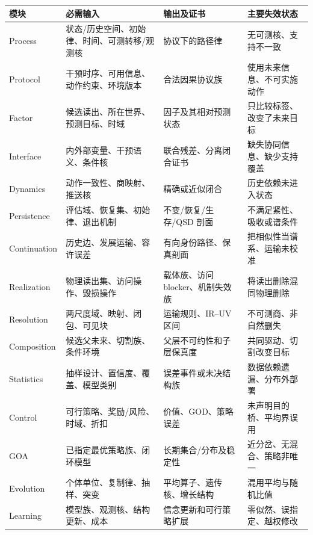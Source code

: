 \documentclass[
  11pt,
  oneside]{book}
\newcounter{none} %
\begin{document}
{\def\LTcaptype{none} %
\begin{longtable}[]{@{}
  >{\raggedright\arraybackslash}p{}
  >{\raggedright\arraybackslash}p{}
  >{\raggedright\arraybackslash}p{}
  >{\raggedright\arraybackslash}p{}@{}}
\toprule\noalign{}
\begin{minipage}[b]{\linewidth}\raggedright
模块
\end{minipage} & \begin{minipage}[b]{\linewidth}\raggedright
必需输入
\end{minipage} & \begin{minipage}[b]{\linewidth}\raggedright
输出及证书
\end{minipage} & \begin{minipage}[b]{\linewidth}\raggedright
主要失效状态
\end{minipage} \\
\midrule\noalign{}
\endhead
\bottomrule\noalign{}
\endlastfoot
Process & 状态/历史空间、初始律、时间、可测转移/观测核 & 协议下的路径律 & 无可测核、支持不一致 \\
Protocol & 干预时序、可用信息、动作约束、环境版本 & 合法因果协议族 & 使用未来信息、不可实施动作 \\
Factor & 候选读出、所在世界、预测目标、时域 & 因子及其相对预测状态 & 只比较标签、改变了未来目标 \\
Interface & 内外部变量、干预语义、条件核 & 联合残差、分离闭合证书 & 缺失协同信息、缺少支持覆盖 \\
Dynamics & 动作一致性、商映射、推送核 & 精确或近似闭合 & 历史依赖未进入状态 \\
Persistence & 评估域、恢复集、初始律、退出机制 & 不变/恢复/生存/QSD 剖面 & 不满足紧性、吸收或谱条件 \\
Continuation & 历史边、发展运输、容许误差 & 有向身份路径、保真剖面 & 把相似性当谱系、运输未校准 \\
Realization & 物理读出集、访问操作、毁损操作 & 载体族、访问 blocker、机制失效族 & 将读出删除混同物理删除 \\
Resolution & 两尺度域、映射、闭包、可见块 & 运输规则、IR--UV 区间 & 不可测商、非自然删失 \\
Composition & 候选父未来、切割族、条件环境 & 父层不可约性和子层保真度 & 共同驱动、切割改变目标 \\
Statistics & 抽样设计、置信度、覆盖、模型类别 & 误差事件或未决结构族 & 数据依赖遗漏、分布外部署 \\
Control & 可行策略、奖励/风险、时域、折扣 & 价值、GOD、策略误差 & 未声明目的桥、平均界误用 \\
GOA & 已指定最优策略族、闭环模型 & 长期集合/分布及稳定性 & 近分岔、无混合、策略非唯一 \\
Evolution & 个体单位、复制律、抽样、突变 & 平均算子、遗传核、增长结构 & 混用平均与随机比值 \\
Learning & 模型族、观测核、结构更新、成本 & 信念更新和可行策略扩展 & 零似然、误指定、越权修改 \\
\end{longtable}
}
\end{document}

